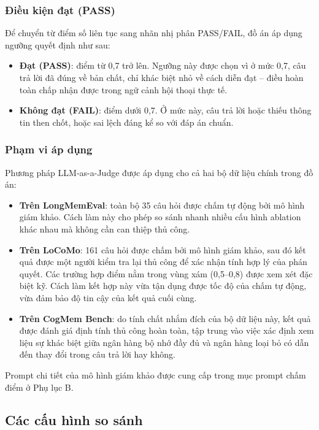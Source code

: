 \documentclass[../main.tex]{subfiles}
\begin{document}
\subsubsection{Điều kiện đạt (PASS)}

Để chuyển từ điểm số liên tục sang nhãn nhị phân PASS/FAIL, đồ án áp dụng ngưỡng quyết định như sau:

\begin{itemize}
    \item \textbf{Đạt (PASS)}: điểm từ 0,7 trở lên. Ngưỡng này được chọn vì ở mức 0,7, câu trả lời đã đúng về bản chất, chỉ khác biệt nhỏ về cách diễn đạt -- điều hoàn toàn chấp nhận được trong ngữ cảnh hội thoại thực tế.
    \item \textbf{Không đạt (FAIL)}: điểm dưới 0,7. Ở mức này, câu trả lời hoặc thiếu thông tin then chốt, hoặc sai lệch đáng kể so với đáp án chuẩn.
\end{itemize}

\subsubsection{Phạm vi áp dụng}

Phương pháp LLM-as-a-Judge được áp dụng cho cả hai bộ dữ liệu chính trong đồ án:

\begin{itemize}
    \item \textbf{Trên LongMemEval}: toàn bộ 35 câu hỏi được chấm tự động bởi mô hình giám khảo. Cách làm này cho phép so sánh nhanh nhiều cấu hình ablation khác nhau mà không cần can thiệp thủ công.
    \item \textbf{Trên LoCoMo}: 161 câu hỏi được chấm bởi mô hình giám khảo, sau đó kết quả được một người kiểm tra lại thủ công để xác nhận tính hợp lý của phán quyết. Các trường hợp điểm nằm trong vùng xám (0,5--0,8) được xem xét đặc biệt kỹ. Cách làm kết hợp này vừa tận dụng được tốc độ của chấm tự động, vừa đảm bảo độ tin cậy của kết quả cuối cùng.
    \item \textbf{Trên CogMem Bench}: do tính chất nhắm đích của bộ dữ liệu này, kết quả được đánh giá định tính thủ công hoàn toàn, tập trung vào việc xác định xem liệu sự khác biệt giữa ngân hàng bộ nhớ đầy đủ và ngân hàng loại bỏ có dẫn đến thay đổi trong câu trả lời hay không.
\end{itemize}

Prompt chi tiết của mô hình giám khảo được cung cấp trong mục prompt chấm điểm ở Phụ lục B.

\subsection{Các cấu hình so sánh}
\end{document}
